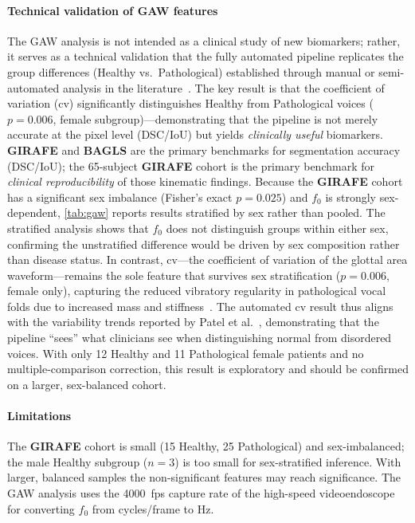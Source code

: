 \documentclass[preprint,12pt]{elsarticle}
\newcommand{\girafe}{\textbf{GIRAFE}}
\newcommand{\bagls}{\textbf{BAGLS}}
\newcommand{\gaw}{GAW}
\begin{document}
\paragraph{Technical validation of \gaw{} features}
The \gaw{} analysis is not intended as a clinical study of new biomarkers;
rather, it serves as a technical validation that the fully automated
pipeline replicates the group differences (Healthy vs.\ Pathological)
established through manual or semi-automated analysis in the
literature~\cite{patel2015kinematic,patel2016nodules,little2007glottal}.
The key result is that the coefficient of variation (cv) significantly
distinguishes Healthy from Pathological voices ($p{=}0.006$, female
subgroup)---demonstrating that the pipeline is not merely accurate at the
pixel level (DSC\slash IoU) but yields \emph{clinically useful} biomarkers.
\girafe{} and \bagls{} are the primary benchmarks for segmentation
accuracy (DSC\slash IoU); the \num{65}-subject \girafe{} cohort is the
primary benchmark for \emph{clinical reproducibility} of those
kinematic findings.
Because the \girafe{} cohort has a significant sex imbalance (Fisher's
exact $p{=}0.025$) and $f_0$ is strongly sex-dependent,
\cref{tab:gaw} reports results stratified by sex rather than pooled.
The stratified analysis shows that $f_0$ does not distinguish groups
within either sex, confirming the unstratified difference would be
driven by sex composition rather than disease status.
In contrast, cv---the coefficient of variation of the glottal area
waveform---remains the sole feature that survives sex stratification
($p{=}0.006$, female only), capturing the reduced vibratory regularity in
pathological vocal folds due to increased mass and
stiffness~\cite{patel2016nodules}.
The automated cv result thus aligns with the variability trends reported
by Patel et al.~\cite{patel2015kinematic}, demonstrating that the
pipeline ``sees'' what clinicians see when distinguishing normal from
disordered voices.
With only \num{12} Healthy and \num{11} Pathological female patients and no
multiple-comparison correction, this result is exploratory and should be
confirmed on a larger, sex-balanced cohort.

\paragraph{Limitations}
The \girafe{} cohort is small (\num{15} Healthy, \num{25} Pathological)
and sex-imbalanced; the male Healthy subgroup ($n{=}3$) is too small for
sex-stratified inference.
With larger, balanced samples the non-significant features may reach
significance.
The \gaw{} analysis uses the \SI{4000}{fps} capture rate of the
high-speed videoendoscope for converting $f_0$ from cycles\slash frame to Hz.
\end{document}
